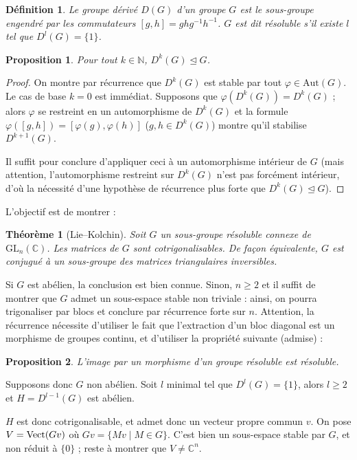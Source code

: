 \documentclass[a4paper, 11pt]{article}
\def\N{\mathbb{N}}
\def\C{\mathbb{C}}
\def\Vect{\textnormal{Vect}}
\def\GL{\mathrm{GL}}
\def\Aut{\mathrm{Aut}}
\newtheorem*{definition}{Définition}
\newtheorem*{proposition}{Proposition}
\newtheorem*{theorem}{Théorème}
\begin{document}
\begin{definition}
  Le \emph{groupe dérivé} $D(G)$ d'un groupe $G$ est le sous-groupe engendré par
  les commutateurs $[g,h]= ghg^{-1}h^{-1}$. $G$ est dit \emph{résoluble} s'il
  existe $l$ tel que $D^l(G) = \{1\}$.
\end{definition}
\begin{proposition}
  Pour tout $k \in \N$, $D^k(G) \trianglelefteq G$.
\end{proposition}
\begin{proof}
  On montre par récurrence que $D^k(G)$ est stable par tout $\varphi \in
  \Aut(G)$. Le cas de base $k=0$ est immédiat. Supposons que $\varphi(D^k(G)) =
  D^k(G)$ ; alors $\varphi$ se restreint en un automorphisme de $D^k(G)$ et la
  formule $\varphi([g,h]) = [\varphi(g),\varphi(h)]$ ($g,h \in D^k(G)$) montre
  qu'il stabilise $D^{k+1}(G)$.

  Il suffit pour conclure d'appliquer ceci à un automorphisme intérieur de $G$
  (mais attention, l'automorphisme restreint sur $D^k(G)$ n'est pas forcément
  intérieur, d'où la nécessité d'une hypothèse de récurrence plus forte que
  $D^k(G) \trianglelefteq G$).
\end{proof}


L'objectif est de montrer :

\begin{theorem}[Lie--Kolchin]
  Soit $G$ un sous-groupe résoluble connexe de $\GL_n(\C)$. Les matrices de $G$
  sont cotrigonalisables. De façon équivalente, $G$ est conjugué à un
  sous-groupe des matrices triangulaires inversibles.
\end{theorem}

Si $G$ est abélien, la conclusion est bien connue. Sinon, $n \geq 2$ et il
suffit de montrer que $G$ admet un sous-espace stable non triviale : ainsi, on
pourra trigonaliser par blocs et conclure par récurrence forte sur $n$.
Attention, la récurrence nécessite d'utiliser le fait que l'extraction d'un bloc
diagonal est un morphisme de groupes continu, et d'utiliser la propriété
suivante (admise) :
\begin{proposition}
  L'image par un morphisme d'un groupe résoluble est résoluble.
\end{proposition}

Supposons donc $G$ non abélien. Soit $l$ minimal tel que $D^l(G) = \{1\}$, alors
$l \geq 2$ et $H = D^{l-1}(G)$ est abélien.

$H$ est donc cotrigonalisable, et admet donc un vecteur propre commun $v$. On
pose $V = \Vect(Gv)$ où $Gv = \{Mv \mid M \in G\}$. C'est bien un sous-espace
stable par $G$, et non réduit à $\{0\}$ ; reste à montrer que $V \neq \C^n$.
\end{document}
